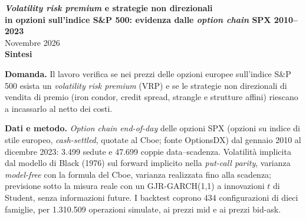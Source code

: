 \documentclass[11pt,a4paper]{article}
\begin{document}
\begin{center}
{\Large\bfseries \emph{Volatility risk premium} e strategie non direzionali\\[2pt] in opzioni sull'indice S\&P 500: evidenza dalle \emph{option chain} SPX 2010--2023}\\[6pt]
{\small Novembre 2026}\\[4pt]
{\bfseries Sintesi}
\end{center}
{\let\thefootnote\relax{}}

\textbf{Domanda.} Il lavoro verifica se nei prezzi delle opzioni europee sull'indice S\&P 500 esista un \emph{volatility risk premium} (VRP) e se le strategie non direzionali di vendita di premio (iron condor, credit spread, strangle e strutture affini) riescano a incassarlo al netto dei costi.

\textbf{Dati e metodo.} \emph{Option chain} \emph{end-of-day} delle opzioni SPX (opzioni su indice di stile europeo, \emph{cash-settled}, quotate al Cboe; fonte OptionsDX) dal gennaio 2010 al dicembre 2023: 3.499 sedute e 47.699 coppie data--scadenza. Volatilità implicita dal modello di Black (1976) sul forward implicito nella \emph{put-call parity}, varianza \emph{model-free} con la formula del Cboe, varianza realizzata fino alla scadenza; previsione sotto la misura reale con un GJR-GARCH(1,1) a innovazioni $t$ di Student, senza informazioni future. I backtest coprono 434 configurazioni di dieci famiglie, per 1.310.509 operazioni simulate, ai prezzi mid e ai prezzi bid-ask.
\end{document}
